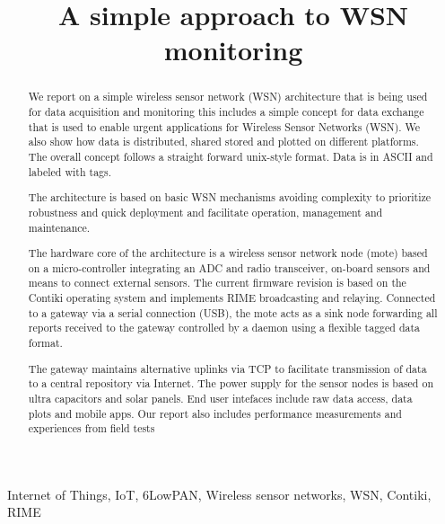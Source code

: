 \documentclass[conference, a4paper,10pt,twocolumn]{IEEEtran}
\begin{document}
\title{A simple approach to WSN monitoring}



\maketitle
\begin{abstract}

We report on a simple wireless sensor network (WSN) architecture that is 
being used for data acquisition and monitoring this includes a simple concept 
for data exchange that is used to enable urgent applications for Wireless 
Sensor Networks (WSN).
We also show how data is distributed, shared stored and plotted on different 
platforms. The overall concept follows a straight forward unix-style format. 
Data is in ASCII and labeled with tags. 

The architecture is based on basic WSN mechanisms avoiding complexity to 
prioritize robustness and quick deployment and facilitate operation, management 
and maintenance.

The hardware core of the architecture is a wireless sensor network node 
(mote) based on a micro-controller integrating an ADC and radio 
transceiver, on-board sensors and means to connect external sensors. The 
current firmware revision is based on the Contiki operating system and 
implements RIME broadcasting and relaying. Connected to a gateway via a 
serial connection (USB), the mote acts as a sink node forwarding all reports 
received to the gateway controlled by a daemon using a flexible tagged 
data format. 

The gateway maintains alternative uplinks via TCP to facilitate 
transmission of data to a central repository via Internet. The power 
supply for the sensor nodes is based on ultra capacitors and solar 
panels. End user intefaces include raw data access, data plots and 
mobile apps. Our report also includes performance measurements and 
experiences from field tests


\end{abstract}

\begin{IEEEkeywords} 
Internet of Things, IoT, 6LowPAN, Wireless sensor networks, WSN, Contiki, RIME
 \end{IEEEkeywords}
\end{document}
